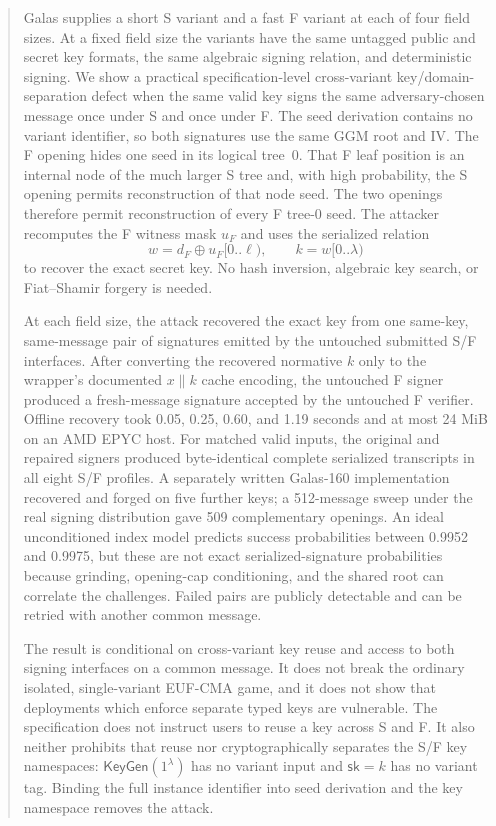 \documentclass[11pt,a4paper]{article}
\newcommand{\xor}{\mathbin{\oplus}}
\newcommand{\KeyGen}{\mathsf{KeyGen}}
\newcommand{\sk}{\mathsf{sk}}
\begin{document}
\begin{abstract}
Galas supplies a short S variant and a fast F variant at each of four field sizes.
At a fixed field size the variants have the same untagged public and secret key
formats, the same algebraic signing relation, and deterministic signing.  We show a
practical specification-level cross-variant key/domain-separation defect when the
same valid key signs the same adversary-chosen message once under S and once under F.
The
seed derivation contains no variant identifier, so both signatures use the same
GGM root and IV.  The F opening hides one seed in its logical tree~0.  That F leaf
position is an internal node of the much larger S tree and, with high probability,
the S opening permits reconstruction of that node seed.  The two openings therefore
permit reconstruction of every F tree-0 seed.
The attacker recomputes the F witness mask $u_F$ and uses the serialized relation
\[
             w=d_F\xor u_F[0..\ell),\qquad k=w[0..\lambda)
\]
to recover the exact secret key.  No hash inversion, algebraic key search, or
Fiat--Shamir forgery is needed.

At each field size, the attack recovered the exact key from one same-key,
same-message pair of signatures emitted by the untouched submitted S/F interfaces.
After converting the recovered normative $k$ only to the wrapper's documented
$x\mathbin\|k$ cache encoding, the untouched F signer produced a fresh-message
signature accepted by the untouched F verifier.  Offline recovery took 0.05,
0.25, 0.60, and 1.19 seconds and at most 24 MiB on an AMD EPYC host.  For matched
valid inputs, the original and repaired signers produced byte-identical complete
serialized transcripts in all eight S/F profiles.  A separately written Galas-160
implementation recovered and forged on five further keys; a 512-message sweep
under the real signing distribution gave 509 complementary openings.  An ideal
unconditioned index model predicts success
probabilities between 0.9952 and 0.9975, but these are not exact serialized-signature
probabilities because grinding, opening-cap conditioning, and the shared root can
correlate the challenges.  Failed pairs are publicly detectable and can be retried
with another common message.

The result is conditional on cross-variant key reuse and access to both signing
interfaces on a common message.  It does not break the ordinary isolated,
single-variant EUF-CMA game, and it does not show that deployments which enforce
separate typed keys are vulnerable.  The specification does not instruct users to
reuse a key across S and F.  It also neither prohibits that reuse nor
cryptographically separates the S/F key namespaces: $\KeyGen(1^\lambda)$ has no
variant input and $\sk=k$ has no variant tag.  Binding the full instance identifier
into seed derivation and the key namespace removes the attack.
\end{abstract}
\end{document}
